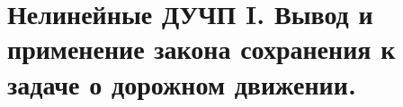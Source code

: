 \chapter{Нелинейные ДУЧП I. Вывод и применение закона сохранения к задаче о
дорожном движении.}

\newpage
